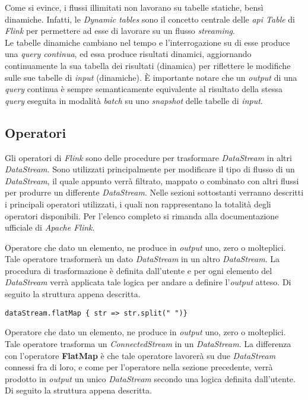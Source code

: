 Come si evince, i flussi illimitati non lavorano su tabelle statiche, bensì dinamiche. Infatti, le \textit{Dynamic tables} sono il concetto centrale delle \textit{\textit{\gls{api}} Table} di \textit{Flink} per permettere ad esse di lavorare su un flusso \textit{streaming}.\\
Le tabelle dinamiche cambiano nel tempo e l'interrogazione su di esse produce una \textit{\textit{\gls{query}} continua}, ed essa produce risultati dinamici, aggiornando continuamente la sua tabella dei risultati (dinamica) per riflettere le modifiche sulle sue tabelle di \textit{input} (dinamiche). È importante notare che un \textit{output} di una \textit{\gls{query}} continua è sempre semanticamente equivalente al risultato della stessa \textit{\gls{query}} eseguita in modalità \textit{batch} su uno \textit{\gls{snapshot}} delle tabelle di \textit{input}.



\subsection{Operatori}\label{sec:operatori}
Gli operatori di \textit{Flink} sono delle procedure per trasformare \textit{DataStream} in altri \textit{DataStream}. Sono utilizzati principalmente per modificare il tipo di flusso di un \textit{DataStream}, il quale appunto verrà filtrato, mappato o combinato con altri flussi per produrre un differente \textit{DataStream}. Nelle sezioni sottostanti verranno descritti i principali operatori utilizzati, i quali non rappresentano la totalità degli operatori disponibili. Per l'elenco completo si rimanda alla documentazione ufficiale di \textit{Apache Flink}.

Operatore che dato un elemento, ne produce in \textit{output} uno, zero o molteplici. Tale operatore trasformerà un dato \textit{DataStream} in un altro \textit{DataStream}. La procedura di trasformazione è definita dall'utente e per ogni elemento del \textit{DataStream} verrà applicata tale logica per andare a definire l'\textit{output} atteso. Di seguito la struttura appena descritta.

\begin{verbatim}
dataStream.flatMap { str => str.split(" ")}
\end{verbatim}
	
	
Operatore che dato un elemento, ne produce in \textit{output} uno, zero o molteplici. Tale operatore trasforma un \textit{ConnectedStream} in un \textit{DataStream}. La differenza con l'operatore \textbf{FlatMap} è che tale operatore lavorerà su due \textit{DataStream} connessi fra di loro, e come per l'operatore nella sezione precedente, verrà prodotto in \textit{output} un unico \textit{DataStream} secondo una logica definita dall'utente. Di seguito la struttura appena descritta.

